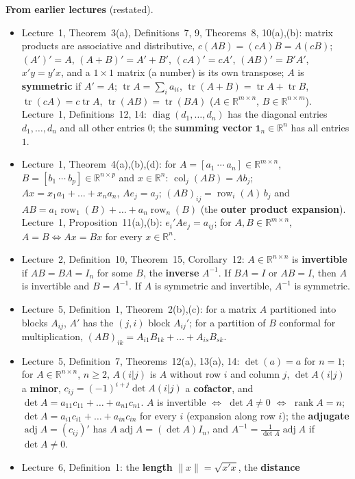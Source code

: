 \documentclass[12pt]{article}
\newcommand{\R}{\mathbb R}
\newcommand{\one}{\mathbf 1}
\DeclareMathOperator{\tr}{tr}
\DeclareMathOperator{\col}{col}
\DeclareMathOperator{\diag}{diag}
\DeclareMathOperator{\rank}{rank}
\theoremstyle{definition}
\newcommand{\lec}[1]{Lecture~#1}
\DeclareMathOperator{\row}{row}
\DeclareMathOperator{\adj}{adj}
\begin{document}
\textbf{From earlier lectures} (restated).
\begin{itemize}[itemsep=0pt,parsep=0pt,topsep=2pt]
\item \lec{1}, Theorem~3(a), Definitions~7, 9, Theorems~8, 10(a),(b): matrix products are associative and
distributive, \(c(AB)=(cA)B=A(cB)\); \((A')'=A\), \((A+B)'=A'+B'\), \((cA)'=cA'\), \((AB)'=B'A'\), \(x'y=y'x\), and a
\(1\times1\) matrix (a number) is its own transpose; \(A\) is \textbf{symmetric} if \(A'=A\); \(\tr A=\sum_ia_{ii}\),
\(\tr(A+B)=\tr A+\tr B\), \(\tr(cA)=c\tr A\), \(\tr(AB)=\tr(BA)\) (\(A\in\R^{m\times n}\),
\(B\in\R^{n\times m}\)). \lec{1}, Definitions~12, 14: \(\diag(d_1,\dots,d_n)\) has the diagonal entries
\(d_1,\dots,d_n\) and all other entries \(0\); the \textbf{summing vector} \(\one_n\in\R^n\) has all entries \(1\).
\item \lec{1}, Theorem~4(a),(b),(d): for \(A=[a_1\ \cdots\ a_n]\in\R^{m\times n}\), \(B=[b_1\ \cdots\ b_p]\in\R^{n\times p}\)
and \(x\in\R^n\): \(\col_j(AB)=Ab_j\); \(Ax=x_1a_1+\dots+x_na_n\), \(Ae_j=a_j\); \((AB)_{ij}=\row_i(A)\,b_j\) and
\(AB=a_1\row_1(B)+\dots+a_n\row_n(B)\) (the \textbf{outer product expansion}). \lec{1}, Proposition~11(a),(b): \(e_i'Ae_j=a_{ij}\); for \(A,B\in\R^{m\times n}\), \(A=B\iff Ax=Bx\) for every
\(x\in\R^n\).
\item \lec{2}, Definition~10, Theorem~15, Corollary~12: \(A\in\R^{n\times n}\) is \textbf{invertible} if
\(AB=BA=I_n\) for some \(B\), the \textbf{inverse} \(A^{-1}\). If \(BA=I\) or \(AB=I\), then \(A\) is invertible and
\(B=A^{-1}\). If \(A\) is symmetric and invertible, \(A^{-1}\) is symmetric.
\item \lec{5}, Definition~1, Theorem~2(b),(c): for a matrix \(A\) partitioned into blocks \(A_{ij}\), \(A'\) has the
\((j,i)\) block \(A_{ij}'\); for a partition of \(B\) conformal for multiplication,
\((AB)_{ik}=A_{i1}B_{1k}+\dots+A_{is}B_{sk}\).
\item \lec{5}, Definition~7, Theorems~12(a), 13(a), 14: \(\det(a)=a\) for \(n=1\); for \(A\in\R^{n\times n}\), \(n\geqslant2\), \(A(i|j)\) is
\(A\) without row \(i\) and column \(j\), \(\det A(i|j)\) a \textbf{minor}, \(c_{ij}=(-1)^{i+j}\det A(i|j)\) a
\textbf{cofactor}, and \(\det A=a_{11}c_{11}+\dots+a_{n1}c_{n1}\). \(A\) is invertible \(\iff\)
\(\det A\ne0\) \(\iff\) \(\rank A=n\); \(\det A=a_{i1}c_{i1}+\dots+a_{in}c_{in}\) for every
\(i\) (expansion along row \(i\)); the \textbf{adjugate} \(\adj A=(c_{ij})'\) has \(A\adj A=(\det A)I_n\), and
\(A^{-1}=\frac1{\det A}\adj A\) if \(\det A\ne0\).
\item \lec{6}, Definition~1: the \textbf{length} \(\lVert x\rVert=\sqrt{x'x}\), the \textbf{distance}

\end{itemize}
\end{document}
